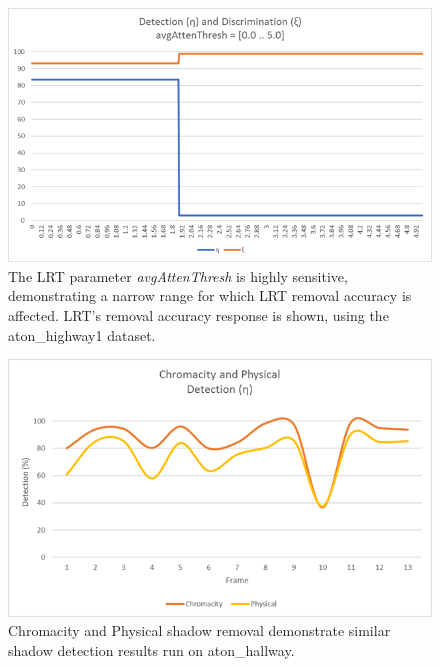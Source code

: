 \begin{figure}
  \centering
  \includegraphics[width=.8\linewidth]{figures/highway1_avgAttenThresh_response.jpg}

\caption{The LRT parameter \textit{avgAttenThresh} is highly sensitive, demonstrating a narrow range for which LRT removal accuracy is affected. LRT's removal accuracy response is shown, using the aton\_highway1 dataset.}
\label{fig:avgattenthresh_response}
\end{figure}


\begin{figure}
\centering
  \includegraphics[width=.8\linewidth]{figures/similarities_chromacity_physical_hallway.jpg}

\caption{Chromacity and Physical shadow removal demonstrate similar shadow detection results run on aton\_hallway.}
\label{fig:similarities}
\end{figure}

